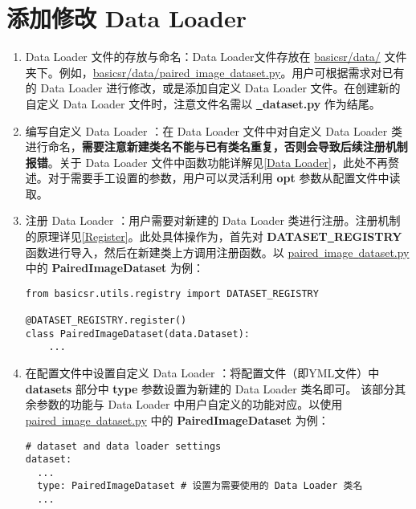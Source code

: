 \documentclass[../main.tex]{subfiles}
\begin{document}
\section{添加修改 Data Loader}
\begin{enumerate}
	\item Data Loader 文件的存放与命名：Data Loader文件存放在 \href{https://github.com/XPixelGroup/BasicSR/tree/master/basicsr/data}{basicsr/data/} 文件夹下。例如，\href{https://github.com/XPixelGroup/BasicSR/tree/master/basicsr/data}{basicsr/data/paired\underline{~}image\underline{~}dataset.py}。用户可根据需求对已有的 Data Loader 进行修改，或是添加自定义 Data Loader 文件。在创建新的自定义 Data Loader 文件时，注意文件名需以  \textbf{\underline{~}dataset.py} 作为结尾。
	
	\item 编写自定义 Data Loader ：在 Data Loader 文件中对自定义 Data Loader 类进行命名，\textbf{需要注意新建类名不能与已有类名重复，否则会导致后续注册机制报错}。关于 Data Loader 文件中函数功能详解见\ref{Data Loader}，此处不再赘述。对于需要手工设置的参数，用户可以灵活利用 \textbf{opt} 参数从配置文件中读取。
	
	\item 注册 Data Loader ：用户需要对新建的 Data Loader 类进行注册。注册机制的原理详见\ref{Register}。此处具体操作为，首先对 \textbf{DATASET\underline{~}REGISTRY} 函数进行导入，然后在新建类上方调用注册函数。以 \href{https://github.com/XPixelGroup/BasicSR/tree/master/basicsr/data/paired_image_dataset.py}{paired\underline{~}image\underline{~}dataset.py} 中的 \textbf{PairedImageDataset} 为例：
\begin{verbatim}
from basicsr.utils.registry import DATASET_REGISTRY

@DATASET_REGISTRY.register()
class PairedImageDataset(data.Dataset):
    ...
\end{verbatim}

	\item 在配置文件中设置自定义 Data Loader ：将配置文件（即YML文件）中 \textbf{datasets} 部分中 \textbf{type} 参数设置为新建的 Data Loader 类名即可。
	该部分其余参数的功能与 Data Loader 中用户自定义的功能对应。以使用 \href{https://github.com/XPixelGroup/BasicSR/tree/master/basicsr/data/paired_image_dataset.py}{paired\underline{~}image\underline{~}dataset.py} 中的 \textbf{PairedImageDataset} 为例：
\begin{verbatim}
# dataset and data loader settings
dataset:
  ...
  type: PairedImageDataset # 设置为需要使用的 Data Loader 类名
  ...
\end{verbatim}
\end{enumerate}
\end{document}
